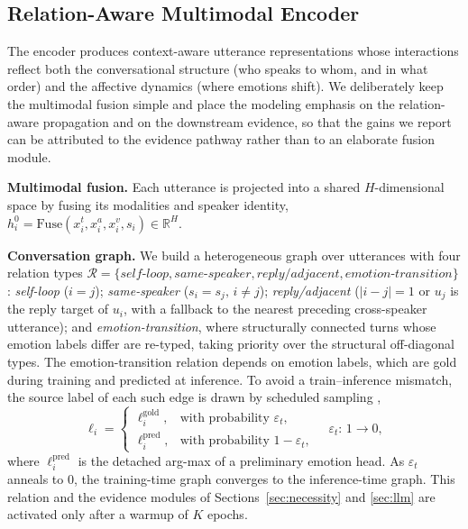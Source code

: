 \documentclass[journal]{IEEEtran}
\newcommand{\Real}{\mathbb{R}}
\newcommand{\Fuse}{\mathrm{Fuse}}
\begin{document}
\subsection{Relation-Aware Multimodal Encoder}
\label{sec:encoder}
The encoder produces context-aware utterance representations whose interactions reflect both
the conversational structure (who speaks to whom, and in what order) and the affective
dynamics (where emotions shift). We deliberately keep the multimodal fusion simple and place
the modeling emphasis on the relation-aware propagation and on the downstream evidence, so
that the gains we report can be attributed to the evidence pathway rather than to an elaborate
fusion module.

\noindent\textbf{Multimodal fusion.} Each utterance is projected into a shared $H$-dimensional
space by fusing its modalities and speaker identity,
$h_i^{0}=\Fuse(x_i^{t},x_i^{a},x_i^{v},s_i)\in\Real^{H}$.

\noindent\textbf{Conversation graph.} We build a heterogeneous graph over utterances with
four relation types $\mathcal{R}=\{\textit{self-loop},\textit{same-speaker},
\textit{reply/adjacent},\textit{emotion-transition}\}$: \emph{self-loop} ($i=j$);
\emph{same-speaker} ($s_i=s_j,\,i\neq j$); \emph{reply/adjacent} ($|i-j|=1$ or $u_j$ is the
reply target of $u_i$, with a fallback to the nearest preceding cross-speaker utterance);
and \emph{emotion-transition}, where structurally connected turns whose emotion labels
differ are re-typed, taking priority over the structural off-diagonal types. The
emotion-transition relation depends on emotion labels, which are gold during training and
predicted at inference. To avoid a train--inference mismatch, the source label of each such
edge is drawn by scheduled sampling \cite{bengio2015scheduled},
\begin{equation}
\ell_i=
\begin{cases}
\ell_i^{\mathrm{gold}}, & \text{with probability } \varepsilon_t,\\
\ell_i^{\mathrm{pred}}, & \text{with probability } 1-\varepsilon_t,
\end{cases}
\quad \varepsilon_t:\,1\!\rightarrow\!0,
\end{equation}
where $\ell_i^{\mathrm{pred}}$ is the detached arg-max of a preliminary emotion head. As
$\varepsilon_t$ anneals to $0$, the training-time graph converges to the inference-time
graph. This relation and the evidence modules of Sections~\ref{sec:necessity} and
\ref{sec:llm} are activated only after a warmup of $K$ epochs.
\end{document}
